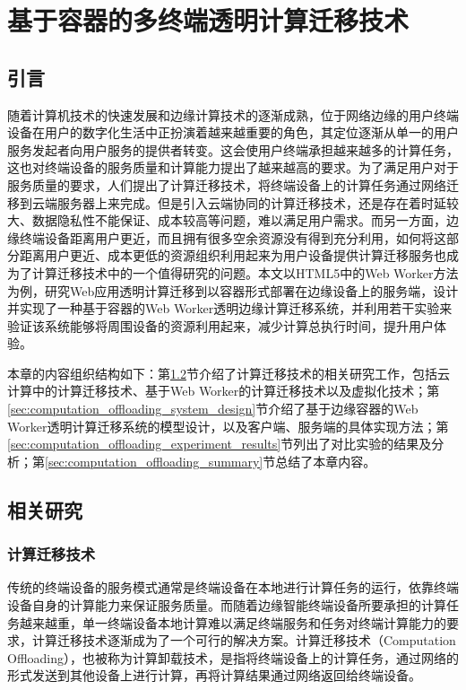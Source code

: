 
\chapter{基于容器的多终端透明计算迁移技术}\label{chap:computation_offloading}

\section{引言}

随着计算机技术的快速发展和边缘计算技术的逐渐成熟，位于网络边缘的用户终端设备在用户的数字化生活中正扮演着越来越重要的角色，其定位逐渐从单一的用户服务发起者向用户服务的提供者转变。这会使用户终端承担越来越多的计算任务，这也对终端设备的服务质量和计算能力提出了越来越高的要求。为了满足用户对于服务质量的要求，人们提出了计算迁移技术，将终端设备上的计算任务通过网络迁移到云端服务器上来完成。但是引入云端协同的计算迁移技术，还是存在着时延较大、数据隐私性不能保证、成本较高等问题，难以满足用户需求。而另一方面，边缘终端设备距离用户更近，而且拥有很多空余资源没有得到充分利用，如何将这部分距离用户更近、成本更低的资源组织利用起来为用户设备提供计算迁移服务也成为了计算迁移技术中的一个值得研究的问题。本文以HTML5中的Web Worker方法为例，研究Web应用透明计算迁移到以容器形式部署在边缘设备上的服务端，设计并实现了一种基于容器的Web Worker透明边缘计算迁移系统，并利用若干实验来验证该系统能够将周围设备的资源利用起来，减少计算总执行时间，提升用户体验。

本章的内容组织结构如下：第\ref{sec:computation_offloading_related_work}节介绍了计算迁移技术的相关研究工作，包括云计算中的计算迁移技术、基于Web Worker的计算迁移技术以及虚拟化技术；第\ref{sec:computation_offloading_system_design}节介绍了基于边缘容器的Web Worker透明计算迁移系统的模型设计，以及客户端、服务端的具体实现方法；第\ref{sec:computation_offloading_experiment_results}节列出了对比实验的结果及分析；第\ref{sec:computation_offloading_summary}节总结了本章内容。

\section{相关研究} \label{sec:computation_offloading_related_work}

\subsection{计算迁移技术}

传统的终端设备的服务模式通常是终端设备在本地进行计算任务的运行，依靠终端设备自身的计算能力来保证服务质量。而随着边缘智能终端设备所要承担的计算任务越来越重，单一终端设备本地计算难以满足终端服务和任务对终端计算能力的要求，计算迁移技术逐渐成为了一个可行的解决方案\cite{张文丽2016智能移动终端计算迁移研究}。计算迁移技术（Computation Offloading），也被称为计算卸载技术，是指将终端设备上的计算任务，通过网络的形式发送到其他设备上进行计算，再将计算结果通过网络返回给终端设备。

